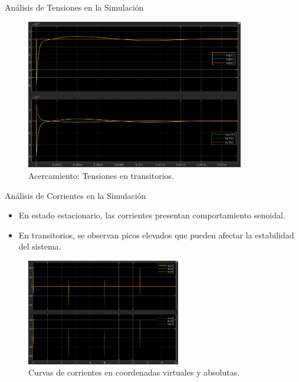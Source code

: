 \documentclass[12pt]{beamer}
\begin{document}
\begin{frame}{Análisis de Tensiones en la Simulación}
    
    \begin{figure}[H]
        \centering
        \includegraphics[width=0.85\textwidth]{Imagenes/AcercamientoTensionesTransitoriosSimulacion.png}
        \caption{Acercamiento: Tensiones en transitorios.}
    \end{figure}
\end{frame}


\begin{frame}{Análisis de Corrientes en la Simulación}
    \begin{itemize}
        \item En estado estacionario, las corrientes presentan comportamiento senoidal.
        \item En transitorios, se observan picos elevados que pueden afectar la estabilidad del sistema.
    \end{itemize}
    \begin{figure}[H]
        \centering
        \includegraphics[width=0.6\textwidth]{Imagenes/CorrientesSimulacionCompleta.png}
        \caption{Curvas de corrientes en coordenadas virtuales y absolutas.}
    \end{figure}
\end{frame}
\end{document}
